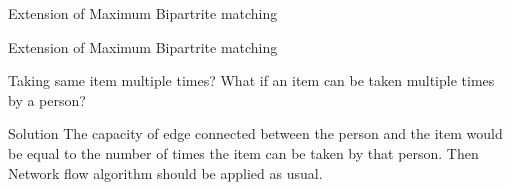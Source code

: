 \documentclass{beamer}
\begin{document}
\begin{frame}{Extension of Maximum Bipartrite matching}
\begin{tikzpicture}
            
            

        \end{tikzpicture}
    
    
\end{frame}

\begin{frame}{Extension of Maximum Bipartrite matching}
    \begin{block}{Taking same item multiple times? }
    What if an item can be taken multiple times by a person?
\end{block}
    \begin{block}{Solution}
        The capacity of edge connected between the  person and the item would be equal to the number of times the item can be taken by that person. Then Network flow algorithm should be applied as usual.
    \end{block}
\end{frame}
\end{document}
